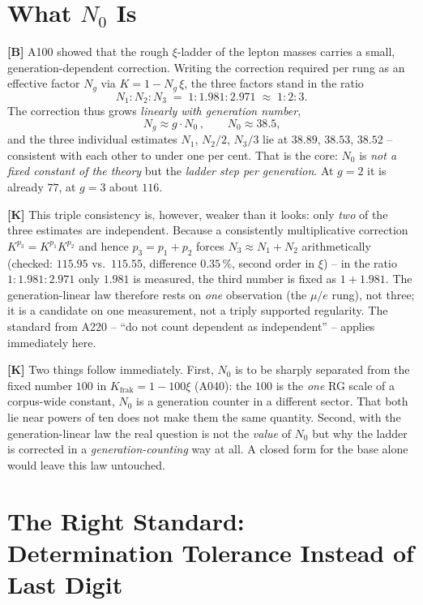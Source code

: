\section{What $N_0$ Is}

\textbf{[B]} A100 showed that the rough $\xi$-ladder of the lepton masses carries
a small, generation-dependent correction. Writing the correction required per rung
as an effective factor $N_g$ via $K = 1 - N_g\,\xi$, the three factors stand in
the ratio
\[
  N_1 : N_2 : N_3 \;=\; 1 : 1{.}981 : 2{.}971 \;\approx\; 1 : 2 : 3 .
\]
The correction thus grows \emph{linearly with generation number},
\[
  \boxed{\,N_g \approx g \cdot N_0\,}, \qquad
  N_0 \approx 38{.}5 ,
\]
and the three individual estimates $N_1$, $N_2/2$, $N_3/3$ lie at $38{.}89$,
$38{.}53$, $38{.}52$ -- consistent with each other to under one per cent. That is
the core: $N_0$ is \emph{not a fixed constant of the theory} but the \emph{ladder
step per generation}. At $g=2$ it is already $77$, at $g=3$ about $116$.

\textbf{[K]} This triple consistency is, however, weaker than it looks: only
\emph{two} of the three estimates are independent. Because a consistently
multiplicative correction $K^{p_3} = K^{p_1}K^{p_2}$ and hence $p_3 = p_1 + p_2$
forces $N_3 \approx N_1 + N_2$ arithmetically (checked: $115{.}95$ vs.\ $115{.}55$,
difference $0{.}35\,\%$, second order in $\xi$) -- in the ratio $1{:}1{.}981{:}2{.}971$
only $1{.}981$ is measured, the third number is fixed as $1 + 1{.}981$. The
generation-linear law therefore rests on \emph{one} observation (the $\mu/e$ rung),
not three; it is a candidate on one measurement, not a triply supported regularity.
The standard from A220 -- ``do not count dependent as independent'' -- applies
immediately here.

\textbf{[K]} Two things follow immediately. First, $N_0$ is to be sharply
separated from the fixed number $100$ in $K_\text{frak} = 1 - 100\xi$ (A040):
the $100$ is the \emph{one} RG scale of a corpus-wide constant, $N_0$ is a
generation counter in a different sector. That both lie near powers of ten does
not make them the same quantity. Second, with the generation-linear law the real
question is not the \emph{value} of $N_0$ but why the ladder is corrected in a
\emph{generation-counting} way at all. A closed form for the base alone would
leave this law untouched.

\section{The Right Standard: Determination Tolerance Instead of Last Digit}

